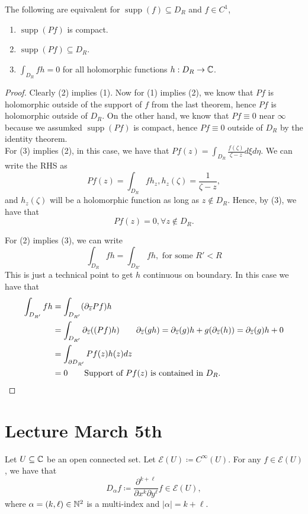 \documentclass{article}
\begin{document}
{\begin{theorem}
    The following are equivalent for $\operatorname{supp}(f) \subseteq D_R$ and $f \in C^1$,
    \begin{enumerate}
        \item $\operatorname{supp}(Pf)$ is compact.
        \item $\operatorname{supp}(Pf) \subseteq D_R$.
        \item $\int_{D_R} fh = 0$ for all holomorphic functions $h: D_R \to \mathbb{C}$.
    \end{enumerate}
\end{theorem}

\begin{proof}
   Clearly (2) implies (1). Now for (1) implies (2), we know that $Pf$ is holomorphic outside of the support of $f$ from the last theorem, hence $Pf$ is holomorphic outside of $D_R$. On the other hand, we know that $Pf \equiv 0$ near $\infty$ because we assumked $\operatorname{supp}(Pf)$ is compact, hence $Pf \equiv 0$ outside of $D_R$ by the identity theorem.\\

   For (3) implies (2), in this case, we have that $Pf(z) = \int_{D_R} \frac{f(\zeta)}{\zeta - z} d\xi d\eta$. We can write the RHS as
   \[Pf(z) = \int_{D_R} f h_z, h_z(\zeta) = \frac{1}{\zeta - z},\]
   and $h_z(\zeta)$ will be a holomorphic function as long as $z \notin D_R$. Hence, by (3), we have that
   \[Pf(z) = 0, \forall z \notin D_R.\]

   For (2) implies (3), we can write
   \[\int_{D_R} fh = \int_{D_{R'}} f h, \text{ for some } R' < R\]
   This is just a technical point to get $h$ continuous on boundary. In this case we have that
   \begin{align*}
       \int_{D_{R'}} fh &= \int_{D_{R'}} (\partial_{\overline{z}} Pf) h\\
       &=  \int_{D_{R'}} \partial_{\overline{z}}( (Pf)h)\tag*{$\partial_{\overline{z}}(gh) = \partial_{\overline{z}}(g) h + g (\partial_{\overline{z}}(h)) = \partial_{\overline{z}}(g) h + 0 $}\\
       &= \int_{\partial D_{R'}} Pf(z) h(z) dz\\
       &= 0 \tag*{Support of $Pf(z)$ is contained in $D_R$.}
   \end{align*}
\end{proof}

\newpage
\section{Lecture March 5th}
Let $U \subseteq \mathbb{C}$ be an open connected set. Let $\mathcal{E}(U) \coloneqq C^\infty(U)$. For any $f \in \mathcal{E}(U)$, we have that
\[D_\alpha f \coloneqq \frac{\partial^{k+\ell}}{\partial x^k \partial y^\ell} f \in \mathcal{E}(U),\]
where $\alpha = (k, \ell) \in \mathbb{N}^2$ is a multi-index and $|\alpha| = k + \ell$.\\

}
\end{document}
